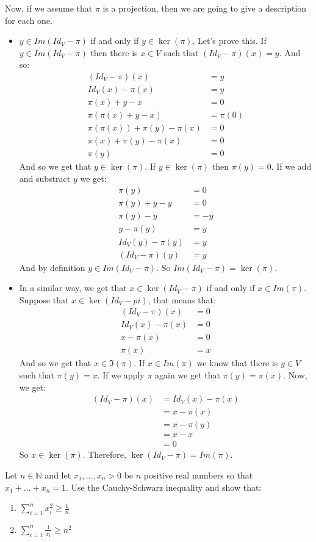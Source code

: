 \documentclass[final,expand]{problemset}
\begin{document}
{\begin{itemize}
	Now, if we assume that $\pi$ is a projection, then we are going to give a description for each one.
	\begin{itemize}
		\item $y \in Im(Id_V - \pi)$ if and only if $y \in \ker(\pi)$. Let's prove this. If $y \in Im(Id_V - \pi)$ then there is $x \in V$ such that $(Id_V - \pi)(x) = y$. And so:
		\begin{align*}
			(Id_V - \pi)(x) &= y\\
			Id_V(x) - \pi(x) &= y\\
			\pi(x) + y - x &=0\\
			\pi(\pi(x) + y - x) &= \pi(0)\\
			\pi(\pi(x)) + \pi(y) - \pi(x) &= 0\\
			\pi(x) + \pi(y) - \pi(x) &= 0\\
			\pi(y) &= 0
		\end{align*} 
		And so we get that $y \in \ker(\pi)$. If $y \in \ker(\pi)$ then $\pi(y) = 0$. If we add and substract $y$ we get:
		\begin{align*}
			\pi(y) &= 0\\
			\pi(y) + y - y &= 0\\
			\pi(y) - y &= -y\\
			y-\pi(y) &= y\\
			Id_V(y) - \pi(y) &= y\\
			(Id_V - \pi)(y) &= y
		\end{align*}
		And by definition $y \in Im(Id_V - \pi)$. So $Im(Id_V - \pi) = \ker(\pi)$.

		\item In a similar way, we get that $x \in \ker(Id_V - \pi)$ if and only if $x \in Im(\pi)$. Suppose that $x \in \ker(Id_V - pi)$, that means that:
		\begin{align*}
			(Id_V-\pi)(x) &= 0\\
			Id_V(x) - \pi(x) &= 0\\
			x - \pi(x) &= 0\\
			\pi(x) &= x
		\end{align*} 
		And so we get that $x \in \Im(\pi)$. If $x \in Im(\pi)$ we know that there is $y \in V$ such that $\pi(y) = x$. If we apply $\pi$ again we get that $\pi(y) = \pi(x)$. Now, we get:
		\begin{align*}
			(Id_V-\pi)(x) &= Id_V(x) - \pi(x)\\
			&= x - \pi(x)\\
			&= x - \pi(y)\\
			&= x - x\\
			&= 0
		\end{align*}
		So $x \in \ker(\pi)$. Therefore, $\ker(Id_V - \pi) = Im(\pi)$.
	\end{itemize}
	\end{itemize}
}

\problem Let $n \in \mathbb{N}$ and let $x_1, \dots, x_n > 0$ be $n$ positive real numbers so that $x_1 + \dots + x_n = 1$. Use the Cauchy-Schwarz inequality and show that:
\begin{enumerate}
	\item $\sum_{i=1}^n x_i^2 \ge \frac{1}{n}$
	\item $\sum_{i=1}^n \frac{1}{x_1} \ge n^2$
\end{enumerate}
\end{document}

